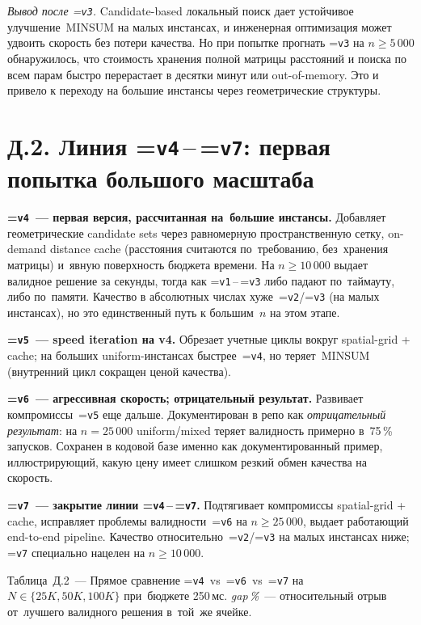 \documentclass[a4paper,14pt]{extreport}
\makeatletter
\let\old@texttt\texttt
\renewcommand{\texttt}[1]{{\sloppy\hyphenchar\font=\m@ne\old@texttt{#1}}}
\makeatother
\begin{document}
\textit{Вывод после \texttt{v3}.} Candidate-based локальный поиск дает устойчивое улучшение~MINSUM на малых инстансах, и инженерная оптимизация может удвоить скорость без потери качества. Но при попытке прогнать \texttt{v3} на $n \geq 5\,000$ обнаружилось, что стоимость хранения полной матрицы расстояний и поиска по всем парам быстро перерастает в десятки минут или out-of-memory. Это и привело к переходу на большие инстансы через геометрические структуры.

\section*{Д.2. Линия \texttt{v4}\,--\,\texttt{v7}: первая попытка большого масштаба}

\textbf{\texttt{v4}~--- первая версия, рассчитанная на~большие инстансы.} Добавляет геометрические candidate sets через равномерную пространственную сетку, on-demand distance cache (расстояния считаются по~требованию, без~хранения матрицы) и~явную поверхность бюджета времени. На $n \geq 10\,000$ выдает валидное решение за секунды, тогда как \texttt{v1}\,--\,\texttt{v3} либо падают по~таймауту, либо по~памяти. Качество в абсолютных числах хуже~\texttt{v2}/\texttt{v3} (на малых инстансах), но это единственный путь к большим~$n$ на этом этапе.

\textbf{\texttt{v5}~--- speed iteration на v4.} Обрезает учетные циклы вокруг spatial-grid + cache; на больших uniform-инстансах быстрее~\texttt{v4}, но теряет~MINSUM (внутренний цикл сокращен ценой качества).

\textbf{\texttt{v6}~--- агрессивная скорость; отрицательный результат.} Развивает компромиссы~\texttt{v5} еще дальше. Документирован в репо как \emph{отрицательный результат}: на $n=25\,000$ uniform/mixed теряет валидность примерно в~75\,\% запусков. Сохранен в кодовой базе именно как документированный пример, иллюстрирующий, какую цену имеет слишком резкий обмен качества на скорость.

\textbf{\texttt{v7}~--- закрытие линии \texttt{v4}\,--\,\texttt{v7}.} Подтягивает компромиссы spatial-grid + cache, исправляет проблемы валидности~\texttt{v6} на $n \geq 25\,000$, выдает работающий end-to-end pipeline. Качество относительно~\texttt{v2}/\texttt{v3} на малых инстансах ниже; \texttt{v7} специально нацелен на $n \geq 10\,000$.

\medskip
\noindent Таблица~Д.2~--- Прямое сравнение \texttt{v4}~vs~\texttt{v6}~vs~\texttt{v7} на~$N\in\{25K,50K,100K\}$ при~бюджете 250\,мс. \emph{gap\,\%}~--- относительный отрыв от~лучшего валидного решения в~той~же ячейке.
\end{document}
